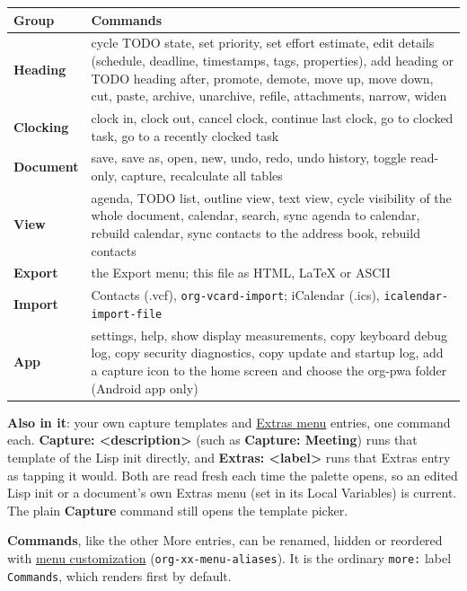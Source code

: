 \documentclass[11pt]{article}
\begin{document}
\begin{center}
\begin{tabular}{ll}
Group & Commands\\[0pt]
\hline
\textbf{Heading} & cycle TODO state, set priority, set effort estimate, edit details (schedule, deadline, timestamps, tags, properties), add heading or TODO heading after, promote, demote, move up, move down, cut, paste, archive, unarchive, refile, attachments, narrow, widen\\[0pt]
\textbf{Clocking} & clock in, clock out, cancel clock, continue last clock, go to clocked task, go to a recently clocked task\\[0pt]
\textbf{Document} & save, save as, open, new, undo, redo, undo history, toggle read-only, capture, recalculate all tables\\[0pt]
\textbf{View} & agenda, TODO list, outline view, text view, cycle visibility of the whole document, calendar, search, sync agenda to calendar, rebuild calendar, sync contacts to the address book, rebuild contacts\\[0pt]
\textbf{Export} & the Export menu; this file as HTML, \LaTeX{} or ASCII\\[0pt]
\textbf{Import} & Contacts (.vcf), \texttt{org-vcard-import}; iCalendar (.ics), \texttt{icalendar-import-file}\\[0pt]
\textbf{App} & settings, help, show display measurements, copy keyboard debug log, copy security diagnostics, copy update and startup log, add a capture icon to the home screen and choose the org-pwa folder (Android app only)\\[0pt]
\end{tabular}
\end{center}

\textbf{Also in it}: your own capture templates and \hyperref[sec:org147f9a0]{Extras menu} entries, one command each. \textbf{Capture: <description>} (such as \textbf{Capture: Meeting}) runs that template of the Lisp init directly, and \textbf{Extras: <label>} runs that Extras entry as tapping it would. Both are read fresh each time the palette opens, so an edited Lisp init or a document's own Extras menu (set in its Local Variables) is current. The plain \textbf{Capture} command still opens the template picker.

\textbf{Commands}, like the other More entries, can be renamed, hidden or reordered with \hyperref[sec:orgc0b0953]{menu customization} (\texttt{org-xx-menu-aliases}). It is the ordinary \texttt{more:} label \texttt{Commands}, which renders first by default.
\end{document}
